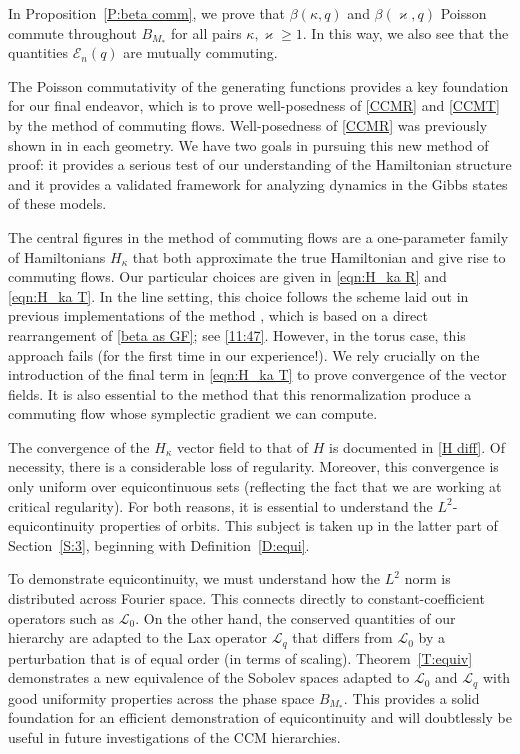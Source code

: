 \documentclass{amsart}
\numberwithin{equation}{section}
\theoremstyle{definition}
\newcommand{\vk}{\varkappa}
\newcommand{\Lc}{\mathcal{L}}
\begin{document}
In Proposition~\ref{P:beta comm}, we prove that $\beta(\kappa,q)$ and $\beta(\vk,q)$ Poisson commute throughout $B_{M_*}$ for all pairs $\kappa,\vk \geq 1$.  In this way, we also see that the quantities $\mathcal E_n(q)$ are mutually commuting.

The Poisson commutativity of the generating functions provides a key foundation for our final endeavor, which is to prove well-posedness of \eqref{CCMR} and \eqref{CCMT} by the method of commuting flows.  Well-posedness of \eqref{CCMR} was previously shown in \cite{badreddine2024global,killip2023scaling} in each geometry.  We have two goals in pursuing this new method of proof: it provides a serious test of our understanding of the Hamiltonian structure and it provides a validated framework for analyzing dynamics in the Gibbs states of these models.

The central figures in the method of commuting flows are a one-parameter family of Hamiltonians $H_\kappa$ that both approximate the true Hamiltonian and give rise to commuting flows.  Our particular choices are given in \eqref{eqn:H_ka R} and \eqref{eqn:H_ka T}.  In the line setting, this choice follows the scheme laid out in previous implementations of the method \cite{MR4304314,MR5031430,MR4726498,killip2024sharp,killip2019kdv}, which is based on a direct rearrangement of \eqref{beta as GF}; see \eqref{11:47}.  However, in the torus case, this approach fails (for the first time in our experience!).  We rely crucially on the introduction of the final term in \eqref{eqn:H_ka T} to prove convergence of the vector fields.  It is also essential to the method that this renormalization produce a commuting flow whose symplectic gradient we can compute.

The convergence of the $H_\kappa$ vector field to that of $H$ is documented in \eqref{H diff}.  Of necessity, there is a considerable loss of regularity.  Moreover, this convergence is only uniform over equicontinuous sets (reflecting the fact that we are working at critical regularity).  For both reasons, it is essential to understand the $L^2$-equicontinuity properties of orbits.  This subject is taken up in the latter part of Section~\ref{S:3}, beginning with Definition~\ref{D:equi}.  

To demonstrate equicontinuity, we must understand how the $L^2$ norm is distributed across Fourier space.  This connects directly to constant-coefficient operators such as $\Lc_0$. On the other hand, the conserved quantities of our hierarchy are adapted to the Lax operator $\Lc_q$ that differs from $\Lc_0$ by a perturbation that is of equal order (in terms of scaling).  Theorem~\ref{T:equiv} demonstrates a new equivalence of the Sobolev spaces adapted to $\Lc_0$ and $\Lc_q$ with good uniformity properties across the phase space $B_{M_*}$.  This provides a solid foundation for an efficient demonstration of equicontinuity and will doubtlessly be useful in future investigations of the CCM hierarchies.
\end{document}
